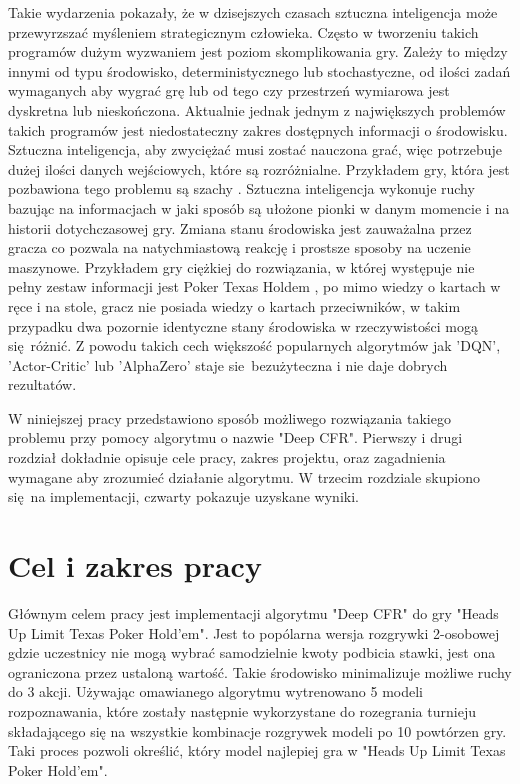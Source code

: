 \documentclass[12pt,oneside,a4paper]{report}
\begin{document}
Takie wydarzenia pokazały, że w dzisejszych czasach sztuczna inteligencja może przewyrzszać
myśleniem strategicznym człowieka.
Często w tworzeniu takich programów dużym wyzwaniem jest poziom skomplikowania gry. 
Zależy to między innymi od typu środowisko, deterministycznego lub stochastyczne, 
od ilości zadań wymaganych aby wygrać grę lub od tego czy przestrzeń wymiarowa jest
dyskretna lub nieskończona.
Aktualnie jednak jednym z największych problemów takich programów jest niedostateczny
zakres dostępnych informacji o środowisku. Sztuczna inteligencja, aby zwyciężać
musi zostać nauczona grać, więc potrzebuje dużej ilości danych wejściowych, które są 
rozróżnialne. Przykładem gry, która jest pozbawiona tego problemu są szachy \cite{chess}. 
Sztuczna inteligencja wykonuje ruchy bazując na informacjach w jaki sposób są ułożone pionki
w danym momencie i na historii dotychczasowej gry. Zmiana stanu środowiska jest
zauważalna przez gracza co pozwala na natychmiastową reakcję i prostsze sposoby na uczenie
maszynowe. Przykładem gry ciężkiej do rozwiązania, w której występuje nie pełny zestaw informacji 
jest Poker Texas Holdem \cite{chess}, po mimo wiedzy o kartach w ręce i na stole, gracz nie posiada wiedzy o 
kartach przeciwników, w takim przypadku dwa pozornie identyczne stany środowiska w
rzeczywistości mogą się różnić. Z powodu takich cech większość popularnych algorytmów jak 
'DQN', 'Actor-Critic' lub 'AlphaZero' staje sie bezużyteczna i nie daje dobrych rezultatów.

W niniejszej pracy przedstawiono sposób możliwego rozwiązania takiego problemu przy pomocy 
algorytmu o nazwie "Deep CFR". Pierwszy i drugi rozdział dokładnie opisuje cele pracy, zakres 
projektu, 
oraz zagadnienia wymagane aby zrozumieć działanie algorytmu. W trzecim rozdziale skupiono się na
implementacji, czwarty pokazuje uzyskane wyniki.


\section{Cel i zakres pracy}

Głównym celem pracy jest implementacji algorytmu "Deep CFR" do gry "Heads Up Limit Texas 
Poker Hold'em". Jest to popólarna wersja rozgrywki 2-osobowej gdzie uczestnicy nie mogą wybrać
samodzielnie kwoty podbicia stawki, jest ona ograniczona przez ustaloną wartość. Takie środowisko
minimalizuje możliwe ruchy do 3 akcji. Używając omawianego algorytmu
wytrenowano 5 modeli rozpoznawania, które zostały następnie wykorzystane do rozegrania
turnieju składającego się na wszystkie kombinacje rozgrywek modeli po
10 powtórzen gry. Taki proces pozwoli określić, który model najlepiej gra w 
"Heads Up Limit Texas Poker Hold'em". 
\end{document}
